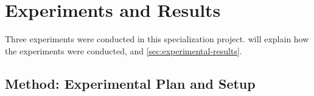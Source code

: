 \chapter{Experiments and Results}
\label{cha:experiments}

Three experiments were conducted in this specialization project.  will explain how the experiments were conducted, and \autoref{sec:experimental-results}.

\section{Method: Experimental Plan and Setup}
\label{sec:experimental-plan-and-setup}

